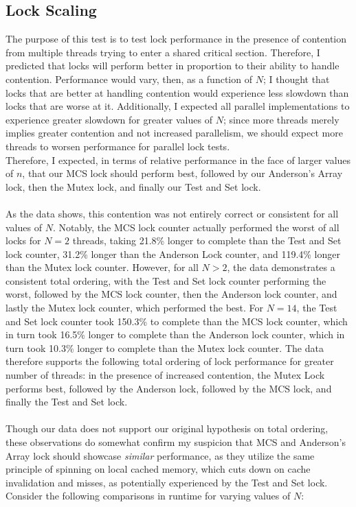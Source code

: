 \documentclass[]{article}
\begin{document}
\subsection{Lock Scaling}
The purpose of this test is to test lock performance in the presence of contention from multiple threads trying to enter a shared critical section. Therefore, I predicted that locks will perform better in proportion to their ability to handle contention. Performance would vary, then, as a function of $N$; I thought that locks that are better at handling contention would experience less slowdown than locks that are worse at it. Additionally, I expected all parallel implementations to experience greater slowdown for greater values of $N$; since more threads merely implies greater contention and not increased parallelism, we should expect more threads to worsen performance for parallel lock tests.
\\
Therefore, I expected, in terms of relative performance in the face of larger values of $n$, that our MCS lock should perform best, followed by our Anderson's Array lock, then the Mutex lock, and finally our Test and Set lock.
\\\\
As the data shows, this contention was not entirely correct or consistent for all values of $N$. Notably, the MCS lock counter actually performed the worst of all locks for $N = 2$ threads, taking 21.8\% longer to complete than the Test and Set lock counter, 31.2\% longer than the Anderson Lock counter, and 119.4\% longer than the Mutex lock counter. However, for all $N > 2$, the data demonstrates a consistent total ordering, with the Test and Set lock counter performing the worst, followed by the MCS lock counter, then the Anderson lock counter, and lastly the Mutex lock counter, which performed the best. For $N = 14$, the Test and Set lock counter took 150.3\% to complete than the MCS lock counter, which in turn took 16.5\% longer to complete than the Anderson lock counter, which in turn took 10.3\% longer to complete than the Mutex lock counter.
The data therefore supports the following total ordering of lock performance for greater number of threads: in the presence of increased contention, the Mutex Lock performs best, followed by the Anderson lock, followed by the MCS lock, and finally the Test and Set lock.
\\\\
Though our data does not support our original hypothesis on total ordering, these observations do somewhat confirm my suspicion that MCS and Anderson's Array lock should showcase \textit{similar} performance, as they utilize the same principle of spinning on local cached memory, which cuts down on cache invalidation and misses, as potentially experienced by the Test and Set lock. Consider the following comparisons in runtime for varying values of $N$:
\end{document}
